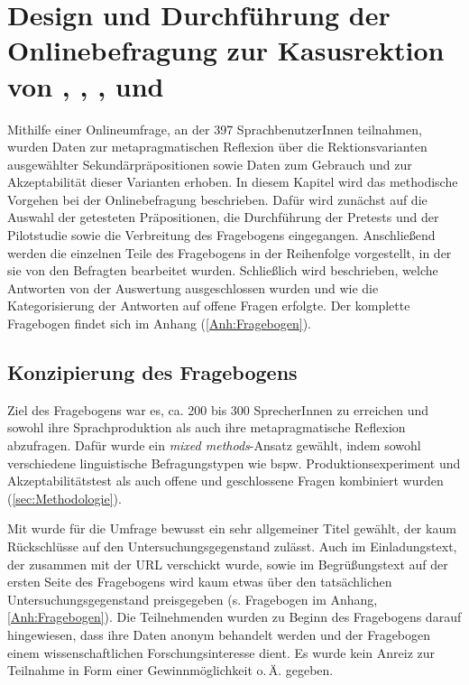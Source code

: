 \chapter[Design und Durchführung der Onlinebefragung]{Design und Durchführung der Onlinebefragung zur Kasusrektion von , , ,  und }
\label{cha:Methode}
Mithilfe einer Onlineumfrage, an der 397 SprachbenutzerInnen teilnahmen, wurden Daten zur metapragmatischen Reflexion über die Rektionsvarianten ausgewählter Sekundärpräpositionen sowie Daten zum Gebrauch und zur Akzeptabilität dieser Varianten erhoben. In diesem Kapitel wird das methodische Vorgehen bei der Onlinebefragung beschrieben. Dafür wird zunächst auf die Auswahl der getesteten Präpositionen, die Durchführung der Pretests und der Pilotstudie sowie die Verbreitung des Fragebogens eingegangen. Anschließend werden die einzelnen Teile des Fragebogens in der Reihenfolge vorgestellt, in der sie von den Befragten bearbeitet wurden. Schließlich wird beschrieben, welche Antworten von der Auswertung ausgeschlossen wurden und wie die Kategorisierung der Antworten auf offene Fragen erfolgte. 
Der komplette Fragebogen findet sich im Anhang (\autoref{Anh:Fragebogen}). 
\section{Konzipierung des Fragebogens}
\label{sec:Konzipierung}
Ziel des Fragebogens war es, ca. 200 bis 300 SprecherInnen zu erreichen und sowohl ihre Sprachproduktion als auch ihre metapragmatische Reflexion abzufragen. Dafür wurde ein \textit{mixed methods}-Ansatz gewählt, indem sowohl verschiedene linguistische Befragungstypen wie bspw. Produktionsexperiment und Akzeptabilitätstest als auch offene und geschlossene Fragen kombiniert wurden (\autoref{sec:Methodologie}). 

Mit  wurde für die Umfrage bewusst ein sehr allgemeiner Titel gewählt, der kaum Rückschlüsse auf den Untersuchungsgegenstand zulässt. Auch im Einladungstext, der zusammen mit der URL verschickt wurde, sowie im Begrüßungstext auf der ersten Seite des Fragebogens wird kaum etwas über den tatsächlichen Untersuchungsgegenstand preisgegeben (s. Fragebogen im Anhang, \autoref{Anh:Fragebogen}). Die Teilnehmenden wurden zu Beginn des Fragebogens darauf hingewiesen, dass ihre Daten anonym behandelt werden und der Fragebogen einem wissenschaftlichen Forschungsinteresse dient. Es wurde kein Anreiz zur Teilnahme in Form einer Gewinnmöglichkeit o.\,Ä. gegeben. 

